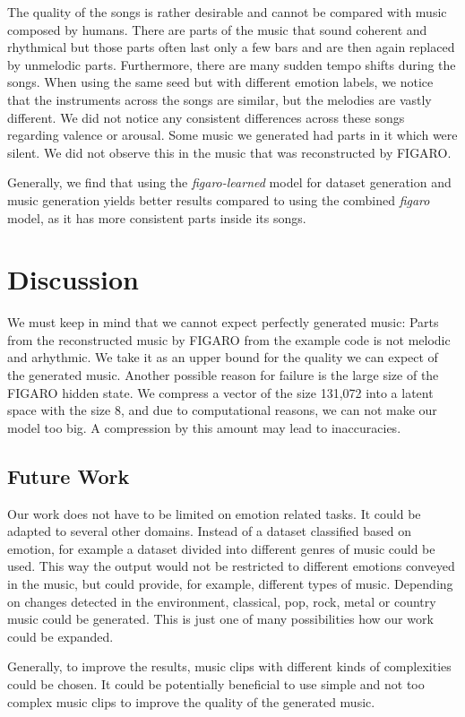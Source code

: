 \documentclass{article}
\begin{document}
The quality of the songs is rather desirable and cannot be compared with music composed by humans. There are parts of the music that sound coherent and rhythmical but those parts often last only a few bars and are then again replaced by unmelodic parts. Furthermore, there are many sudden tempo shifts during the songs. When using the same seed but with different emotion labels, we notice that the instruments across the songs are similar, but the melodies are vastly different. We did not notice any consistent differences across these songs regarding valence or arousal. Some music we generated had parts in it which were silent. We did not observe this in the music that was reconstructed by FIGARO.

Generally, we find that using the \textit{figaro-learned} model for dataset generation and music generation yields better results compared to using the combined \textit{figaro} model, as it has more consistent parts inside its songs. 

\section{Discussion}
We must keep in mind that we cannot expect perfectly generated music: Parts from the reconstructed music by FIGARO from the example code is not melodic and arhythmic. We take it as an upper bound for the quality we can expect of the generated music. Another possible reason for failure is the large size of the FIGARO hidden state. We compress a vector of the size 131,072 into a latent space with the size 8, and due to computational reasons, we can not make our model too big. A compression by this amount may lead to inaccuracies.

\subsection{Future Work}
Our work does not have to be limited on emotion related tasks. It could be adapted to several other domains. Instead of a dataset classified based on emotion, for example a dataset divided into different genres of music could be used. This way the output would not be restricted to different emotions conveyed in the music, but could provide, for example, different types of music. Depending on changes detected in the environment, classical, pop, rock, metal or country music could be generated. This is just one of many possibilities how our work could be expanded.

Generally, to improve the results, music clips with different kinds of complexities could be chosen. It could be potentially beneficial to use simple and not too complex music clips to improve the quality of the generated music.
\end{document}
